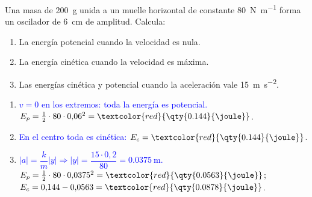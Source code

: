 \begin{exercise}
    Una masa de \qty{200}{\g} unida a un muelle horizontal de constante \qty{80}{\newton\per\m} forma un oscilador de
    \qty{6}{\cm} de amplitud. Calcula:
    \begin{enumerate}[label=\letraminuscula]
        \item La energía potencial cuando la velocidad es nula.
        \item La energía cinética cuando la velocidad es máxima.
        \item Las energías cinética y potencial cuando la aceleración vale \qty{15}{\m\per\second\squared}.
    \end{enumerate}
    \begin{solu}
        \begin{enumerate}[label=\letraminuscula]
            \item \textcolor{blue}{\(v = 0\) en los extremos: toda la energía es potencial.} \(E_p = \frac{1}{2}\cdot 80\cdot 0{,}06^2 = \textcolor{red}{\qty{0.144}{\joule}}\).
            \item \textcolor{blue}{En el centro toda es cinética:} \(E_c = \textcolor{red}{\qty{0.144}{\joule}}\).
            \item \textcolor{blue}{\(|a| = \dfrac{k}{m}|y| \Rightarrow |y| = \dfrac{15\cdot 0{,}2}{80} = \qty{0.0375}{\m}\).}
            \(E_p = \frac{1}{2}\cdot 80\cdot 0{,}0375^2 = \textcolor{red}{\qty{0.0563}{\joule}}\); \(E_c = 0{,}144 - 0{,}0563 = \textcolor{red}{\qty{0.0878}{\joule}}\).
        \end{enumerate}
    \end{solu}
\end{exercise}
